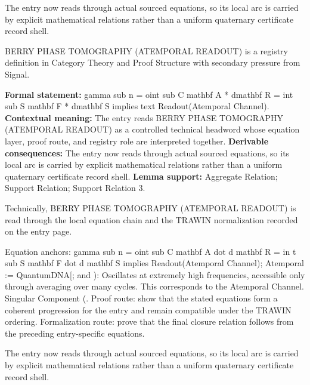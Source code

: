 The entry now reads through actual sourced equations, so its local arc is carried by explicit mathematical relations rather than a uniform quaternary certificate record shell.
\clearpage


\begingroup\small
{}
BERRY PHASE TOMOGRAPHY (ATEMPORAL READOUT) is a registry definition in Category Theory and Proof Structure with secondary pressure from Signal.

\begingroup\footnotesize\setlength{\emergencystretch}{3em}\sloppy
\textbf{Formal statement:} gamma sub n = oint sub C mathbf A * dmathbf R = int sub S mathbf F * dmathbf S implies text Readout(Atemporal Channel). \textbf{Contextual meaning:} The entry reads BERRY PHASE TOMOGRAPHY (ATEMPORAL READOUT) as a controlled technical headword whose equation layer, proof route, and registry role are interpreted together. \textbf{Derivable consequences:} The entry now reads through actual sourced equations, so its local arc is carried by explicit mathematical relations rather than a uniform quaternary certificate record shell. \textbf{Lemma support:} Aggregate Relation; Support Relation; Support Relation 3.\par
\endgroup

Technically, BERRY PHASE TOMOGRAPHY (ATEMPORAL READOUT) is read through the local equation chain and the TRAWIN normalization recorded on the entry page.

Equation anchors: gamma sub n = oint sub C mathbf A dot d mathbf R = in t sub S mathbf F dot d mathbf S implies Readout(Atemporal Channel); Atemporal := QuantumDNA[; and ): Oscillates at extremely high frequencies, accessible only through averaging over many cycles. This corresponds to the Atemporal Channel. Singular Component (. Proof route: show that the stated equations form a coherent progression for the entry and remain compatible under the TRAWIN ordering. Formalization route: prove that the final closure relation follows from the preceding entry-specific equations.

The entry now reads through actual sourced equations, so its local arc is carried by explicit mathematical relations rather than a uniform quaternary certificate record shell.
\endgroup

